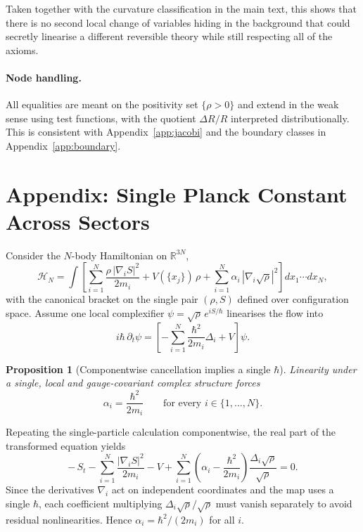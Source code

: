 \documentclass[11pt,a4paper]{article}
\numberwithin{equation}{section}
\theoremstyle{thmcompact}
\newtheorem{proposition}[theorem]{Proposition}
\theoremstyle{remark}
\begin{document}
Taken together with the curvature classification in the main text, this shows that there is no second local change of variables hiding in the background that could secretly linearise a different reversible theory while still respecting all of the axioms.

\paragraph{Node handling.}
All equalities are meant on the positivity set $\{\rho>0\}$ and extend in the weak sense using test functions, with the quotient $\Delta R/R$ interpreted distributionally. This is consistent with Appendix~\ref{app:jacobi} and the boundary classes in Appendix~\ref{app:boundary}.

\section{Appendix: Single Planck Constant Across Sectors}
\label{app:single-hbar}

Consider the $N$-body Hamiltonian on $\mathbb{R}^{3N}$,
\[
\mathcal{H}_N=\int\left[
\sum_{i=1}^N \frac{\rho\,|\nabla_i S|^2}{2m_i}
+ V(\{x_j\})\,\rho
+ \sum_{i=1}^N \alpha_i\,|\nabla_i\sqrt{\rho}|^2
\right]dx_1\cdots dx_N,
\]
with the canonical bracket on the single pair $(\rho,S)$ defined over configuration space.
Assume one local complexifier $\psi=\sqrt{\rho}\,e^{iS/\hbar}$ linearises the flow into
\[
i\hbar\,\partial_t\psi
=\left[-\sum_{i=1}^N\frac{\hbar^2}{2m_i}\Delta_i+V\right]\psi.
\]

\begin{proposition}[Componentwise cancellation implies a single $\hbar$]
	\label{prop:single-hbar}
	Linearity under a single, local and gauge-covariant complex structure forces
	\[
	\alpha_i=\frac{\hbar^2}{2m_i}\qquad \text{for every } i\in\{1,\dots,N\}.
	\]
\end{proposition}

	Repeating the single-particle calculation componentwise, the real part of the transformed equation yields
	\[
	-\,S_t - \sum_{i=1}^N \frac{|\nabla_i S|^2}{2m_i} - V
	+ \sum_{i=1}^N \left(\alpha_i - \frac{\hbar^2}{2m_i}\right)\frac{\Delta_i\sqrt{\rho}}{\sqrt{\rho}}=0.
	\]
	Since the derivatives $\nabla_i$ act on independent coordinates and the map uses a single $\hbar$, each coefficient multiplying $\Delta_i\sqrt{\rho}/\sqrt{\rho}$ must vanish separately to avoid residual nonlinearities. Hence $\alpha_i=\hbar^2/(2m_i)$ for all $i$.
\end{document}
